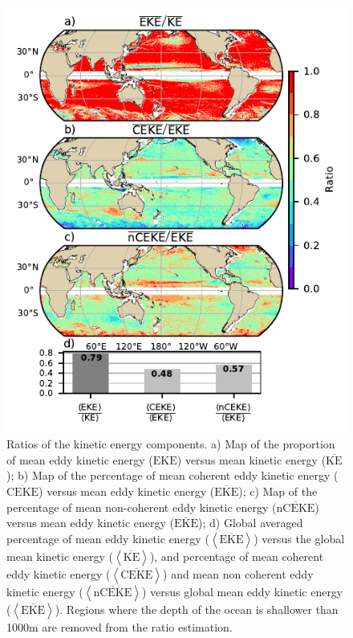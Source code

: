 \documentclass[draft,linenumbers]{agujournal2019}
\newcommand{\MKE}{\overline{\textrm{KE}}}
\newcommand{\MEKE}{\overline{\textrm{EKE}}}
\newcommand{\EKE}{\textrm{EKE}}
\newcommand{\MCEKE}{\overline{\textrm{CEKE}}}
\newcommand{\MnCEKE}{\overline{\textrm{nCEKE}}}
\begin{document}
	\begin{figure}
	    \centering
	    \includegraphics[width=1\textwidth]{figures/eke_ratio_map_easy.pdf}
	    \caption{Ratios of the kinetic energy components. a) Map of the proportion of mean eddy kinetic energy ($\EKE$) versus mean kinetic energy ($\MKE$);
		b) Map of the percentage of mean coherent eddy kinetic energy ($\MCEKE$) versus mean eddy kinetic energy ($\MEKE$);
		c) Map of the percentage of mean non-coherent eddy kinetic energy ($\MnCEKE$) versus mean eddy kinetic energy ($\MEKE$);
		d) Global averaged percentage of mean eddy kinetic energy ($\left<\MEKE\right>$) versus the global mean kinetic energy ($\left<\MKE\right>$), and percentage of mean coherent eddy kinetic energy ($\left<\MCEKE\right>$) and mean non coherent eddy kinetic energy ($\left<\MnCEKE\right>$) versus global mean eddy kinetic energy ($\left<\MEKE\right>$). Regions where the depth of the ocean is shallower than 1000m are removed from the ratio estimation.
		}
	    \label{fig:eddy_ratio}
	\end{figure}
\end{document}
